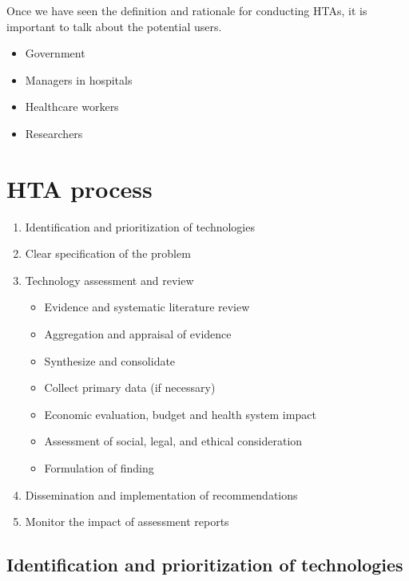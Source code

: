 \documentclass[
]{book}
\providecommand{\tightlist}{%
  \setlength{\itemsep}{0pt}\setlength{\parskip}{0pt}}
\begin{document}
Once we have seen the definition and rationale for conducting HTAs, it is important to talk about the potential users.

\begin{itemize}
\tightlist
\item
  Government
\item
  Managers in hospitals
\item
  Healthcare workers
\item
  Researchers
\end{itemize}

\hypertarget{hta-process}{%
\section{HTA process}\label{hta-process}}

\begin{enumerate}
\def\labelenumi{\arabic{enumi}.}
\tightlist
\item
  Identification and prioritization of technologies
\item
  Clear specification of the problem
\item
  Technology assessment and review

  \begin{itemize}
  \tightlist
  \item
    Evidence and systematic literature review
  \item
    Aggregation and appraisal of evidence
  \item
    Synthesize and consolidate
  \item
    Collect primary data (if necessary)
  \item
    Economic evaluation, budget and health system impact
  \item
    Assessment of social, legal, and ethical consideration
  \item
    Formulation of finding
  \end{itemize}
\item
  Dissemination and implementation of recommendations
\item
  Monitor the impact of assessment reports
\end{enumerate}

\hypertarget{identification-and-prioritization-of-technologies}{%
\subsection{Identification and prioritization of technologies}\label{identification-and-prioritization-of-technologies}}
\end{document}
